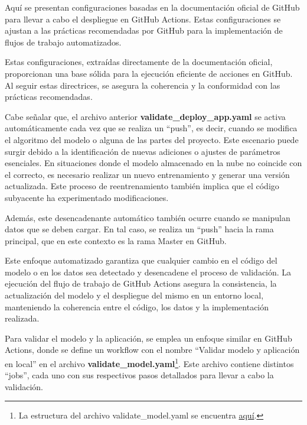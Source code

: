Aquí se presentan configuraciones basadas en la documentación oficial de GitHub para llevar a cabo el despliegue en GitHub Actions. Estas configuraciones se ajustan a las prácticas recomendadas por GitHub para la implementación de flujos de trabajo automatizados. \newline

Estas configuraciones, extraídas directamente de la documentación oficial, proporcionan una base sólida para la ejecución eficiente de acciones en GitHub. Al seguir estas directrices, se asegura la coherencia y la conformidad con las prácticas recomendadas. \newline

Cabe señalar que, el archivo anterior  \textbf{validate\_deploy\_app.yaml} se activa automáticamente cada vez que se realiza un ``push'', es decir, cuando se modifica el algoritmo del modelo o alguna de las partes del proyecto. Este escenario puede surgir debido a la identificación de nuevas adiciones o ajustes de parámetros esenciales. En situaciones donde el modelo almacenado en la nube no coincide con el correcto, es necesario realizar un nuevo entrenamiento y generar una versión actualizada. Este proceso de reentrenamiento también implica que el código subyacente ha experimentado modificaciones. \newline

Además, este desencadenante automático también ocurre cuando se manipulan datos que se deben cargar. En tal caso, se realiza un ``push'' hacia la rama principal, que en este contexto es la rama Master en GitHub. \newline

Este enfoque automatizado garantiza que cualquier cambio en el código del modelo o en los datos sea detectado y desencadene el proceso de validación. La ejecución del flujo de trabajo de GitHub Actions asegura la consistencia, la actualización del modelo y el despliegue del mismo en un entorno local, manteniendo la coherencia entre el código, los datos y la implementación realizada.

\newpage

Para validar el modelo y la aplicación, se emplea un enfoque similar en GitHub Actions, donde se define un workflow con el nombre ``Validar modelo y aplicación en local'' en el archivo \textbf{validate\_model.yaml}\footnote{La estructura del archivo  validate\_model.yaml se encuentra \href{https://github.com/juferoto/mlops_project/blob/master/.github/workflows/validate_model.yaml}{aquí}.}. Este archivo contiene distintos ``jobs'', cada uno con sus respectivos pasos detallados para llevar a cabo la validación. \newline

